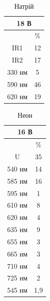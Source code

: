 \documentclass[a4paper,14pt]{extreport}
\begin{document}
\begin{table}[h!]
		\begin{center}
	    \caption{Натрій}
		\begin{tabular}{|c|c|}
		\hline
		\multicolumn{2}{|c|}{18 В}                              \\ \hline
		                             & \%                       \\ \hline
		IR1                          & 12                     \\ \hline
		IR2                          & 17                      \\ \hline
		330 нм                       & 5                     \\ \hline
		590 нм                       & 46                      \\ \hline
		620 нм                       & 19                     \\ \hline
		\end{tabular}
			\end{center}
\end{table}
\begin{table}[h!]
	\begin{center}
	\caption{Неон}
		\begin{tabular}{|c|c|}
		
		\hline
		\multicolumn{2}{|c|}{16 В}                              \\ \hline
		                             & \%                       \\ \hline
		U                       & 35                   \\ \hline
		540 нм                       & 14                      \\ \hline
		585 нм                       & 16                    \\ \hline
		595 нм                       & 1                      \\ \hline
		610 нм                       & 8                    \\ \hline
		620 нм                       & 4                      \\ \hline
		635 нм                       & 9                    \\ \hline
		655 нм                       & 3                    \\ \hline
		665 нм                       & 3                    \\ \hline
		710 нм                       & 4                    \\ \hline
		725 нм                       & 2                     \\ \hline
		\multicolumn{1}{|l|}{545 нм} & \multicolumn{1}{l|}{1,9} \\ \hline
		\end{tabular}
	\end{center}
\end{table}
\end{document}
